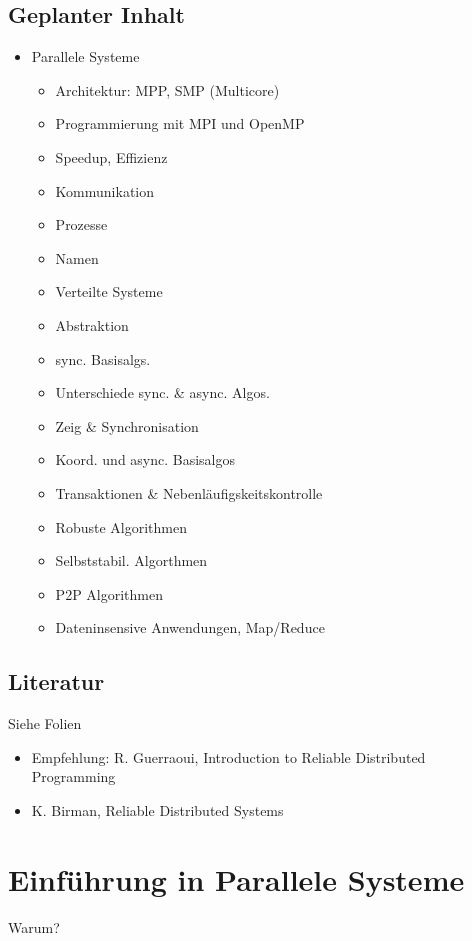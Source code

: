 \subsection{Geplanter Inhalt}

\begin{itemize}
	\item  Parallele Systeme
		\begin{itemize}
			\item Architektur: MPP, SMP (Multicore)
			\item Programmierung mit MPI und OpenMP
			\item Speedup, Effizienz
			\item Kommunikation
			\item Prozesse
			\item Namen
		\end{itemize}
		\begin{itemize}
			\item  Verteilte Systeme
			\item Abstraktion
			\item sync. Basisalgs.
			\item Unterschiede sync. \& async. Algos.
			\item Zeig \& Synchronisation
			\item Koord. und async. Basisalgos
			\item Transaktionen \& Nebenläufigskeitskontrolle
			\item Robuste Algorithmen
			\item Selbststabil. Algorthmen
			\item P2P Algorithmen
			\item Dateninsensive Anwendungen, Map/Reduce
		\end{itemize}
\end{itemize}
\subsection{Literatur}
Siehe Folien
\begin{itemize}
	\item Empfehlung: R. Guerraoui, Introduction to Reliable Distributed Programming
	\item K. Birman, Reliable Distributed Systems
\end{itemize}

\section{Einführung in Parallele Systeme}
Warum?

